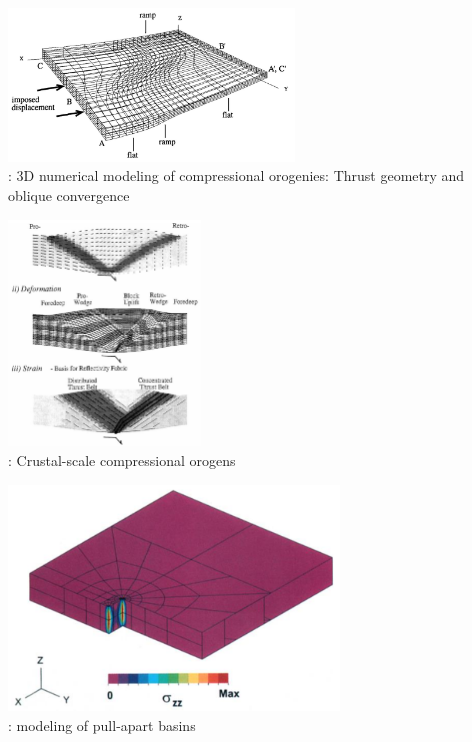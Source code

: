 \begin{center}
\begin{minipage}{0.45\textwidth}
\centering
\includegraphics[width=7.6cm]{images/history/brau93}\\
{: 3D numerical modeling of
compressional orogenies: Thrust geometry and
oblique convergence \cite{brau93}}
\end{minipage}\hfill
\begin{minipage}{0.45\textwidth}
\centering
\includegraphics[height=6cm]{images/history/bequ94}\\
{: Crustal-scale compressional orogens \cite{bequ94}}
\end{minipage}
\end{center}

\begin{center}
\includegraphics[height=6cm]{images/history/katl95}\\
{: modeling of pull-apart basins \cite{katl95}}
\end{center}


